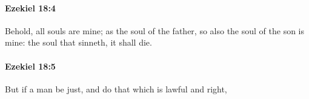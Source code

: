 		\paragraph{Ezekiel 18:4} %
			\label{EZEKIEL-18-4}

			Behold, all souls are mine; as the soul of the father, so also the soul of the son is mine: the soul that sinneth, it shall die.


		\paragraph{Ezekiel 18:5} %
			\label{EZEKIEL-18-5}

			But if a man be just, and do that which is lawful and right,


